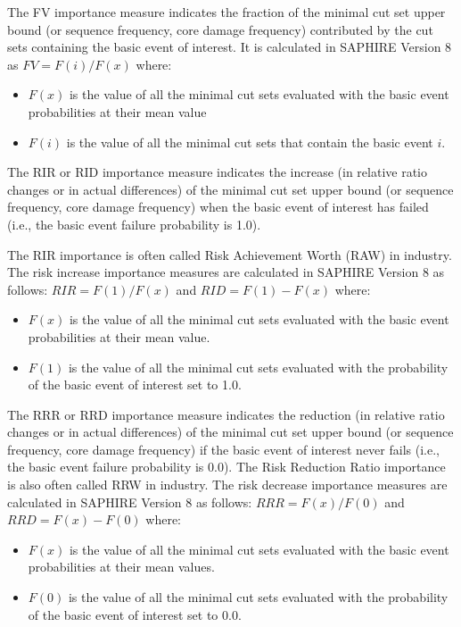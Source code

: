 The FV importance measure indicates the fraction of the minimal cut set upper bound 
(or sequence frequency, core damage frequency) contributed by the cut sets containing the basic event of interest. 
It is calculated in SAPHIRE Version 8 as $FV = F(i) / F(x)$
where:
\begin{itemize}
  \item $F(x)$ is the value of all the minimal cut sets evaluated with the basic event probabilities at their mean value
  \item $F(i)$ is the value of all the minimal cut sets that contain the basic event $i$.
\end{itemize}

    
The RIR or RID importance measure indicates the increase (in relative ratio changes or in actual differences) of the minimal cut set upper bound (or sequence frequency, core damage frequency) when the basic event of interest has failed (i.e., the basic event failure probability is 1.0). 

The RIR importance is often called Risk Achievement Worth (RAW) in industry. The risk increase importance measures are calculated in SAPHIRE Version 8 as follows: $RIR = F(1)/F(x)$ and $RID=F(1)-F(x)$
where:
\begin{itemize} 
  \item $F(x)$ is the value of all the minimal cut sets evaluated with the basic event probabilities at their mean value.
  \item $F(1)$ is the value of all the minimal cut sets evaluated with the probability of the basic event of interest set to 1.0.
\end{itemize}

The RRR or RRD importance measure indicates the reduction (in relative ratio changes or in actual differences) of the minimal cut set upper bound (or sequence frequency, core damage frequency) if the basic event of interest never fails (i.e., the basic event failure probability is 0.0). The Risk Reduction Ratio importance is also often called RRW in industry. The risk decrease importance measures are calculated in SAPHIRE Version 8 as follows:
$RRR =F(x)/F(0)$ and $RRD=F(x)-F(0)$ where:
\begin{itemize} 
  \item $F(x)$ is the value of all the minimal cut sets evaluated with the basic event probabilities at their mean values.
  \item $F(0)$ is the value of all the minimal cut sets evaluated with the probability of the basic event of interest set to 0.0.
\end{itemize}

